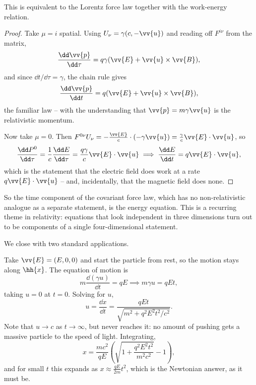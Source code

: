 \begin{proposition}
	This is equivalent to the Lorentz force law together with the work-energy relation.
\end{proposition}
\begin{proof}
	Take $\mu = i$ spatial. Using $U_\nu = \gamma(c, -\vv{u})$ and reading off $F^{i\nu}$ from the matrix,
	$$
	\frac{\dd \vv{p}}{\dd \tau} = q\gamma(\vv{E} + \vv{u}\times\vv{B}),
	$$
	and since $\dd t/\dd\tau = \gamma$, the chain rule gives
	$$
	\frac{\dd \vv{p}}{\dd t} = q(\vv{E}+\vv{u}\times\vv{B}),
	$$
	the familiar law -- with the understanding that $\vv{p} = m\gamma\vv{u}$ is the relativistic momentum.

	Now take $\mu = 0$. Then $F^{0\nu}U_\nu = -\frac{\vv{E}}{c}\cdot(-\gamma\vv{u}) = \frac{\gamma}{c}\vv{E}\cdot\vv{u}$, so
	$$
	\frac{\dd P^0}{\dd\tau} = \frac{1}{c}\frac{\dd E}{\dd \tau} = \frac{q\gamma}{c}\vv{E}\cdot\vv{u} \implies \frac{\dd E}{\dd t} = q\vv{E}\cdot\vv{u},
	$$
	which is the statement that the electric field does work at a rate $q\vv{E}\cdot\vv{u}$ -- and, incidentally, that the magnetic field does none.
\end{proof}

So the time component of the covariant force law, which has no non-relativistic analogue as a separate statement, is the energy equation. This is a recurring theme in relativity: equations that look independent in three dimensions turn out to be components of a single four-dimensional statement.

We close with two standard applications.

\begin{example}
	Take $\vv{E} = (E,0,0)$ and start the particle from rest, so the motion stays along $\hh{x}$. The equation of motion is
	$$
	m\frac{\dd(\gamma u)}{\dd t} = qE \implies m\gamma u = qEt,
	$$
	taking $u = 0$ at $t=0$. Solving for $u$,
	$$
	u = \frac{\dd x}{\dd t} = \frac{qEt}{\sqrt{m^2 + q^2E^2t^2/c^2}}.
	$$
	Note that $u \to c$ as $t \to \infty$, but never reaches it: no amount of pushing gets a massive particle to the speed of light. Integrating,
	$$
	x = \frac{mc^2}{qE}\left(\sqrt{1 + \frac{q^2E^2t^2}{m^2c^2}} - 1\right),
	$$
	and for small $t$ this expands as $x \approx \frac{qE}{2m}t^2$, which is the Newtonian answer, as it must be.
\end{example}


